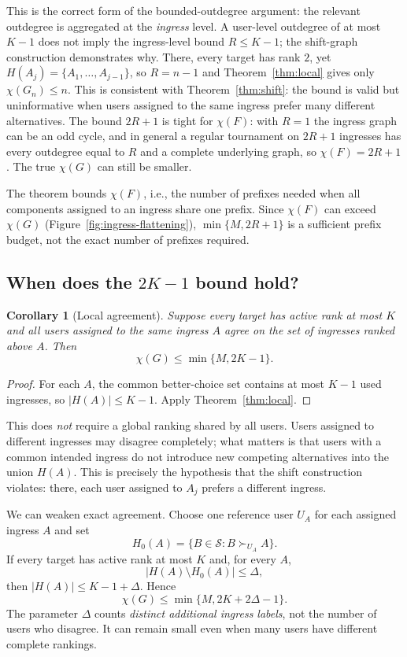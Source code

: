 \documentclass[10pt,a4paper]{article}
\newtheorem{corollary}[theorem]{Corollary}
\newcommand{\Sset}{\mathcal S}
\begin{document}
This is the correct form of the bounded-outdegree argument: the relevant outdegree is aggregated at the \emph{ingress} level. A user-level outdegree of at most $K-1$ does not imply the ingress-level bound $R\le K-1$; the shift-graph construction demonstrates why. There, every target has rank $2$, yet $H(A_j)=\{A_1,\ldots,A_{j-1}\}$, so $R=n-1$ and Theorem~\ref{thm:local} gives only $\chi(G_n)\le n$. This is consistent with Theorem~\ref{thm:shift}: the bound is valid but uninformative when users assigned to the same ingress prefer many different alternatives. The bound $2R+1$ is tight for $\chi(F)$: with $R=1$ the ingress graph can be an odd cycle, and in general a regular tournament on $2R+1$ ingresses has every outdegree equal to $R$ and a complete underlying graph, so $\chi(F)=2R+1$. The true $\chi(G)$ can still be smaller.

The theorem bounds $\chi(F)$, i.e., the number of prefixes needed when all components assigned to an ingress share one prefix. Since $\chi(F)$ can exceed $\chi(G)$ (Figure~\ref{fig:ingress-flattening}), $\min\{M,2R+1\}$ is a sufficient prefix budget, not the exact number of prefixes required.

\subsection{When does the $2K-1$ bound hold?}

\begin{corollary}[Local agreement]\label{cor:agreement}
Suppose every target has active rank at most $K$ and all users assigned to the same ingress $A$ agree on the set of ingresses ranked above $A$. Then
\[
\chi(G)\le\min\{M,2K-1\}.
\]
\end{corollary}
\begin{proof}
For each $A$, the common better-choice set contains at most $K-1$ used ingresses, so $|H(A)|\le K-1$. Apply Theorem~\ref{thm:local}.
\end{proof}

This does \emph{not} require a global ranking shared by all users. Users assigned to different ingresses may disagree completely; what matters is that users with a common intended ingress do not introduce new competing alternatives into the union $H(A)$. This is precisely the hypothesis that the shift construction violates: there, each user assigned to $A_j$ prefers a different ingress.

We can weaken exact agreement. Choose one reference user $U_A$ for each assigned ingress $A$ and set
\[
H_0(A)=\{B\in\Sset:B\succ_{U_A}A\}.
\]
If every target has active rank at most $K$ and, for every $A$,
\[
|H(A)\setminus H_0(A)|\le\Delta,
\]
then $|H(A)|\le K-1+\Delta$. Hence
\begin{equation}\label{eq:delta}
\boxed{\chi(G)\le\min\{M,2K+2\Delta-1\}.}
\end{equation}
The parameter $\Delta$ counts \emph{distinct additional ingress labels}, not the number of users who disagree. It can remain small even when many users have different complete rankings.
\end{document}
